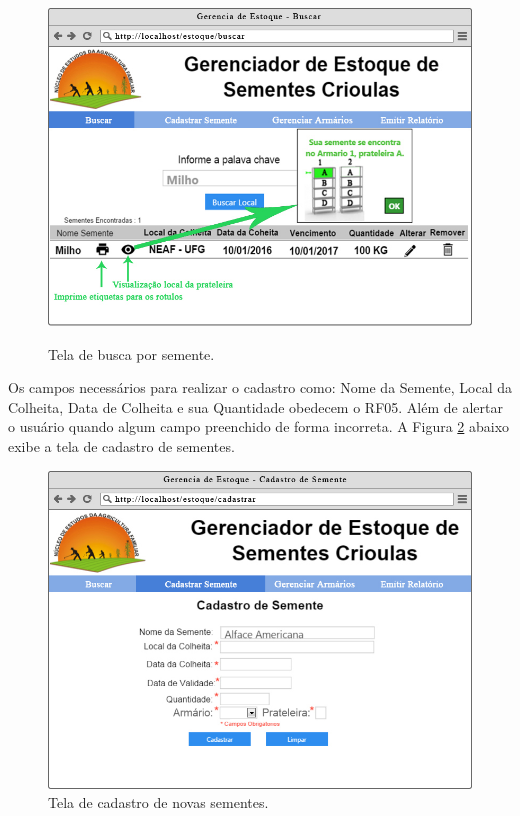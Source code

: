 \documentclass[12pt,a4paper]{article}
\begin{document}
\begin{figure}[H]
\centering %
\includegraphics[width=14cm]{Figuras/busca.jpg} %
\label{figura:Tela_de_busca_sementes}
\caption{Tela de busca por semente.}
\end{figure}

Os campos necessários para realizar o cadastro como: Nome da Semente, Local da Colheita, Data de Colheita e sua Quantidade obedecem o RF05. Além de alertar o usuário quando algum campo preenchido de forma incorreta.
A Figura \ref{figura:Tela_cadastro} abaixo exibe a tela de cadastro de sementes.


\begin{figure}[H]
\centering %
\includegraphics[width=14cm]{Figuras/cadastrar.jpg} %
\caption{Tela de cadastro de novas sementes.}
\label{figura:Tela_cadastro}
\end{figure}
\end{document}
